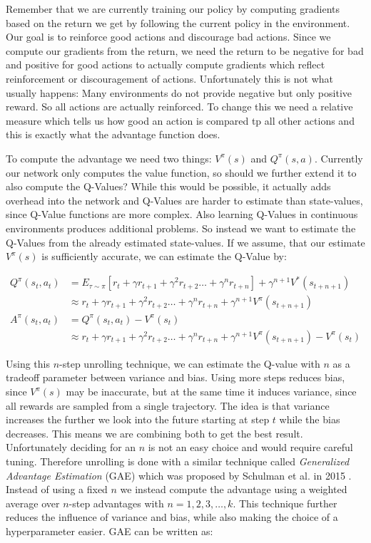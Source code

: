 Remember that we are currently training our policy by computing gradients based on the return we get by following the current policy in the environment. Our goal is to reinforce good actions and discourage bad actions. Since we compute our gradients from the return, we need the return to be negative for bad and positive for good actions to actually compute gradients which reflect reinforcement or discouragement of actions. Unfortunately this is not what usually happens: Many environments do not provide negative but only positive reward. So all actions are actually reinforced. To change this we need a relative measure which tells us how good an action is compared tp all other actions and this is exactly what the advantage function does. 

To compute the advantage we need two things: $V^\pi(s)$ and $Q^\pi(s, a)$. Currently our network only computes the value function, so should we further extend it to also compute the Q-Values? While this would be possible, it actually adds overhead into the network and Q-Values are harder to estimate than state-values, since Q-Value functions are more complex. Also learning Q-Values in continuous environments produces additional problems. So instead we want to estimate the Q-Values from the already estimated state-values. If we assume, that our estimate $V^\pi(s)$ is sufficiently accurate, we can estimate the Q-Value by:

\begin{align*}
Q^\pi(s_t, a_t) &= E_{\tau\sim\pi}\left[r_t + \gamma r_{t+1} + \gamma^2 r_{t+2} \dots + \gamma^n r_{t+n}\right] + \gamma^{n+1}V^*(s_{t+n+1}) \\
&\approx r_t + \gamma r_{t+1} + \gamma^2 r_{t+2} \dots + \gamma^n r_{t+n} + \gamma^{n+1}V^\pi(s_{t+n+1}) \\[15pt]
A^\pi(s_t, a_t) &= Q^\pi(s_t, a_t) - V^\pi(s_t) \\
&\approx r_t + \gamma r_{t+1} + \gamma^2 r_{t+2} \dots + \gamma^n r_{t+n} + \gamma^{n+1}V^\pi(s_{t+n+1}) - V^\pi(s_t)
\end{align*}

Using this $n$-step unrolling technique, we can estimate the Q-value with $n$ as a tradeoff parameter between variance and bias. Using more steps reduces bias, since $V^\pi(s)$ may be inaccurate, but at the same time it induces variance, since all rewards are sampled from a single trajectory. The idea is that variance increases the further we look into the future starting at step $t$ while the bias decreases. This means we are combining both to get the best result. Unfortunately deciding for an $n$ is not an easy choice and would require careful tuning. Therefore unrolling is done with a similar technique called \textit{Generalized Advantage Estimation} (GAE) which was proposed by Schulman et al. in 2015 \cite{schulman2015high}. Instead of using a fixed $n$ we instead compute the advantage using a weighted average over $n$-step advantages with $n = 1, 2, 3, \dots, k$. This technique further reduces the influence of variance and bias, while also making the choice of a hyperparameter easier. GAE can be written as:

